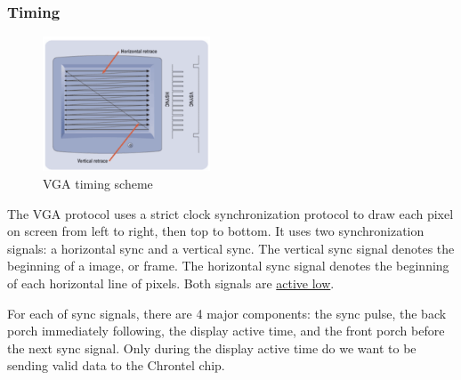 \documentclass[11pt]{article}
\begin{document}
\subsubsection{Timing}

\begin{figure}[H]
\begin{center}
	\includegraphics[height=4cm]{vga_overview}
	\caption{VGA timing scheme}
	\label{fig:vga_overview}
\end{center}
\end{figure}

The VGA protocol uses a strict clock synchronization protocol to draw each pixel on screen from left to right, then top to bottom. It uses two synchronization signals: a horizontal sync and a vertical sync. The vertical sync signal denotes the beginning of a image, or frame. The horizontal sync signal denotes the beginning of each horizontal line of pixels. Both signals are \underline{active low}.

For each of sync signals, there are 4 major components: the sync pulse, the back porch immediately following, the display active time, and the front porch before the next sync signal. Only during the display active time do we want to be sending valid data to the Chrontel chip.
\end{document}
